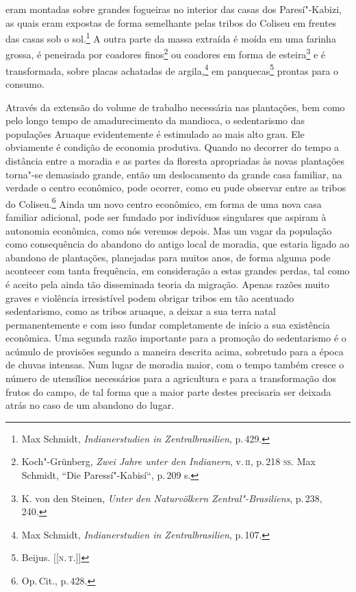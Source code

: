 eram montadas sobre grandes fogueiras no interior das casas dos
Paresí"-Kabizi, as quais eram expostas de forma semelhante pelas tribos
do Coliseu em frentes das casas sob o sol.\footnote{Max Schmidt,
  \textit{Indianerstudien in Zentralbrasilien}, p.\,429.} A outra parte da
massa extraída é moída em uma farinha grossa, é peneirada por coadores
finos\footnote{Koch"-Grünberg, \textit{Zwei Jahre unter den Indianern}, v.\,\textsc{ii}, p.\,218 \textsc{ss}. Max Schmidt, ``Die Paressí"-Kabisí``, p.\,209 s.} ou
coadores em forma de esteira\footnote{K. von den Steinen, \textit{Unter
  den Naturvölkern Zentral"-Brasiliens}, p.\,238, 240.} e é transformada,
sobre placas achatadas de argila,\footnote{Max Schmidt,
  \textit{Indianerstudien in Zentralbrasilien}, p.\,107.} em panquecas\footnote{Beijus. {[}{[}\textsc{n.\,t.}{]}{]}}
 prontas para o consumo.

Através da extensão do volume de trabalho necessária nas plantações, bem
como pelo longo tempo de amadurecimento da mandioca, o sedentarismo das
populações Aruaque evidentemente é estimulado ao mais alto grau. Ele
obviamente é condição de economia produtiva. Quando no decorrer do
tempo a distância entre a moradia e as partes da floresta apropriadas às
novas plantações torna"-se demasiado grande, então um deslocamento da
grande casa familiar, na verdade o centro econômico, pode ocorrer, como
eu pude observar entre as tribos do Coliseu.\footnote{Op.\,Cit., p.\,428.}
Ainda um novo centro econômico, em forma de uma nova casa familiar
adicional, pode ser fundado por indivíduos singulares que aspiram à
autonomia econômica, como nós veremos depois. Mas um vagar da população
como consequência do abandono do antigo local de moradia, que estaria
ligado ao abandono de plantações, planejadas para muitos anos, de forma
alguma pode acontecer com tanta frequência, em consideração a estas
grandes perdas, tal como é aceito pela ainda tão disseminada teoria da
migração. Apenas razões muito graves e violência irresistível podem
obrigar tribos em tão acentuado sedentarismo, como as tribos aruaque, a
deixar a sua terra natal permanentemente e com isso fundar
completamente de início a sua existência econômica. Uma segunda razão
importante para a promoção do sedentarismo é o acúmulo de provisões
segundo a maneira descrita acima, sobretudo para a época de chuvas
intensas. Num lugar de moradia maior, com o tempo também cresce o
número de utensílios necessários para a agricultura e para a
transformação dos frutos do campo, de tal forma que a maior parte destes
precisaria ser deixada atrás no caso de um abandono do lugar.

